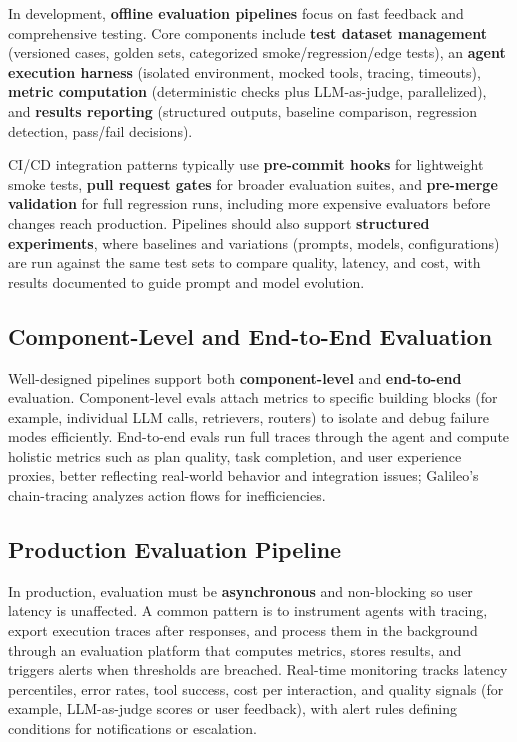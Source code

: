 \begin{TNtwocol}
In development, \textbf{offline evaluation pipelines} focus on fast feedback and comprehensive testing. Core components include \textbf{test dataset management} (versioned cases, golden sets, categorized smoke/regression/edge tests), an \textbf{agent execution harness} (isolated environment, mocked tools, tracing, timeouts), \textbf{metric computation} (deterministic checks plus LLM-as-judge, parallelized), and \textbf{results reporting} (structured outputs, baseline comparison, regression detection, pass/fail decisions).

CI/CD integration patterns typically use \textbf{pre-commit hooks} for lightweight smoke tests, \textbf{pull request gates} for broader evaluation suites, and \textbf{pre-merge validation} for full regression runs, including more expensive evaluators before changes reach production. Pipelines should also support \textbf{structured experiments}, where baselines and variations (prompts, models, configurations) are run against the same test sets to compare quality, latency, and cost, with results documented to guide prompt and model evolution.

\subsection*{Component-Level and End-to-End Evaluation}

Well-designed pipelines support both \textbf{component-level} and \textbf{end-to-end} evaluation. Component-level evals attach metrics to specific building blocks (for example, individual LLM calls, retrievers, routers) to isolate and debug failure modes efficiently. End-to-end evals run full traces through the agent and compute holistic metrics such as plan quality, task completion, and user experience proxies, better reflecting real-world behavior and integration issues; Galileo's chain-tracing analyzes action flows for inefficiencies.
​

\subsection*{Production Evaluation Pipeline}

In production, evaluation must be \textbf{asynchronous} and non-blocking so user latency is unaffected. A common pattern is to instrument agents with tracing, export execution traces after responses, and process them in the background through an evaluation platform that computes metrics, stores results, and triggers alerts when thresholds are breached. Real-time monitoring tracks latency percentiles, error rates, tool success, cost per interaction, and quality signals (for example, LLM-as-judge scores or user feedback), with alert rules defining conditions for notifications or escalation.


\end{TNtwocol}
